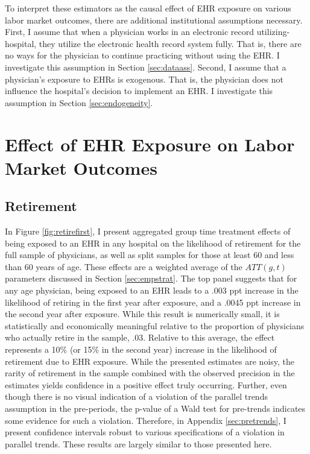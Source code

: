 \documentclass[12pt]{article}
\begin{document}
To interpret these estimators as the causal effect of EHR exposure on various labor market outcomes, there are additional institutional assumptions necessary. First, I assume that when a physician works in an electronic record utilizing-hospital, they utilize the electronic health record system fully. That is, there are no ways for the physician to continue practicing without using the EHR. I investigate this assumption in Section \ref{sec:dataass}. Second, I assume that a physician's exposure to EHRs is exogenous. That is, the physician does not influence the hospital's decision to implement an EHR. I investigate this assumption in Section \ref{sec:endogeneity}. 





\section{Effect of EHR Exposure on Labor Market Outcomes}

\subsection{Retirement}


In Figure \ref{fig:retirefirst}, I present aggregated group time treatment effects of being exposed to an EHR in any hospital on the likelihood of retirement for the full sample of physicians, as well as split samples for those at least 60 and less than 60 years of age. These effects are a weighted average of the $ATT(g,t)$ parameters discussed in Section \ref{sec:empstrat}. The top panel suggests that for any age physician, being exposed to an EHR leads to a .003 ppt increase in the likelihood of retiring in the first year after exposure, and a .0045 ppt increase in the second year after exposure. While this result is numerically small, it is statistically and economically meaningful relative to the proportion of physicians who actually retire in the sample, .03. Relative to this average, the effect represents a 10\% (or 15\% in the second year) increase in the likelihood of retirement due to EHR exposure. While the presented estimates are noisy, the rarity of retirement in the sample combined with the observed precision in the estimates yields confidence in a positive effect truly occurring. Further, even though there is no visual indication of a violation of the parallel trends assumption in the pre-periods, the p-value of a Wald test for pre-trends indicates some evidence for such a violation. Therefore, in Appendix \ref{sec:pretrends}, I present confidence intervals robust to various specifications of a violation in parallel trends. These results are largely similar to those presented here.
\end{document}
